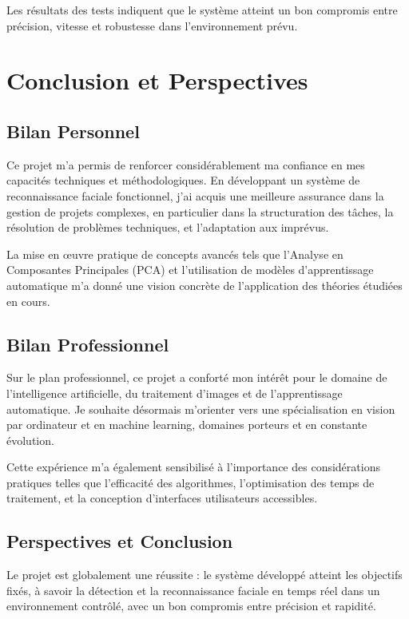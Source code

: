 \documentclass[a4paper,12pt]{report} %
\begin{document}
Les résultats des tests indiquent que le système atteint un bon compromis entre précision, vitesse et robustesse dans l'environnement prévu.

\chapter{Conclusion et Perspectives}

\section{Bilan Personnel}

Ce projet m'a permis de renforcer considérablement ma confiance en mes capacités techniques et méthodologiques.  
En développant un système de reconnaissance faciale fonctionnel, j'ai acquis une meilleure assurance dans la gestion de projets complexes, en particulier dans la structuration des tâches, la résolution de problèmes techniques, et l'adaptation aux imprévus.

La mise en œuvre pratique de concepts avancés tels que l'Analyse en Composantes Principales (PCA) et l'utilisation de modèles d'apprentissage automatique m'a donné une vision concrète de l'application des théories étudiées en cours.

\section{Bilan Professionnel}

Sur le plan professionnel, ce projet a conforté mon intérêt pour le domaine de l'intelligence artificielle, du traitement d'images et de l'apprentissage automatique.  
Je souhaite désormais m'orienter vers une spécialisation en vision par ordinateur et en machine learning, domaines porteurs et en constante évolution.

Cette expérience m'a également sensibilisé à l'importance des considérations pratiques telles que l'efficacité des algorithmes, l'optimisation des temps de traitement, et la conception d'interfaces utilisateurs accessibles.

\section{Perspectives et Conclusion}

Le projet est globalement une réussite :  
le système développé atteint les objectifs fixés, à savoir la détection et la reconnaissance faciale en temps réel dans un environnement contrôlé, avec un bon compromis entre précision et rapidité.
\end{document}
